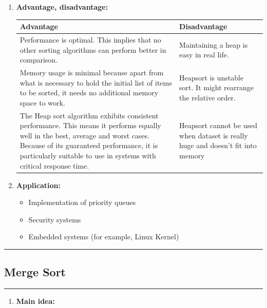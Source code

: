 \documentclass[11pt,a4paper]{article}
\begin{document}
{\begin{enumerate}[label=\textbf{\arabic*})]
					Levcopoulos and Petersson describe a variation of heapsort based on a Cartesian tree that does not add an element to the heap until smaller values on both sides of it have already been included in the sorted output. As they show, this modification can allow the algorithm to sort more quickly than O(n log n) for inputs that are already nearly sorted.
				\item \textbf{Advantage, disadvantage:}
					\begin{table}[H]
						\centering
						\begin{tabular}{|p{8cm}|p{8cm}|}
							\hline
							\textbf{Advantage} & \textbf{Disadvantage} \\
							\hline
							\hline
							Performance is optimal. This implies that no other sorting algorithms can perform better in comparison. & Maintaining a heap is easy in real life. \\[12pt]
							Memory usage is minimal because apart from what is necessary to hold the initial list of items to be sorted, it needs no additional memory space to work. & Heapsort is unstable sort. It might rearrange the relative order.\\[12pt]
							The Heap sort algorithm exhibits consistent performance. This means it performs equally well in the best, average and worst cases. Because of its guaranteed performance, it is particularly suitable to use in systems with critical response time. & Heapsort cannot be used when dataset is really huge and doesn't fit into memory\\
							\hline
						\end{tabular}
					\end{table}
				\item \textbf{Application:}	
					\begin{itemize}
						\item Implementation of priority queues
						\item Security systems
						\item Embedded systems (for example, Linux Kernel)
					\end{itemize}
			\end{enumerate}
		
		\rule{15cm}{0.1cm}
		\subsection{Merge Sort}
		\rule{15cm}{0.1cm}
			\begin{enumerate}[label=\textbf{\arabic*})]
				\item \textbf{Main idea:}
				

\end{enumerate}}
\end{document}
